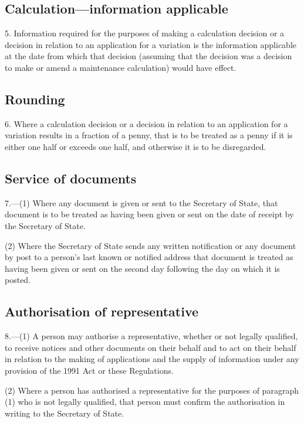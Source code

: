 \documentclass[12pt,a4paper]{article}
\begin{document}
\subsection[5. Calculation---information applicable]{Calculation---information applicable}

5.  Information required for the purposes of making a calculation decision or a decision in relation to an application for a variation is the information applicable at the date from which that decision (assuming that the decision was a decision to make or amend a maintenance calculation) would have effect.

\subsection[6. Rounding]{Rounding}

6.  Where a calculation decision or a decision in relation to an application for a variation results in a fraction of a penny, that is to be treated as a penny if it is either one half or exceeds one half, and otherwise it is to be disregarded.

\subsection[7. Service of documents]{Service of documents}

7.---(1)  Where any document is given or sent to the Secretary of State, that document is to be treated as having been given or sent on the date of receipt by the Secretary of State.

(2) Where the Secretary of State sends any written notification or any document by post to a person’s last known or notified address that document is treated as having been given or sent on the second day following the day on which it is posted.

\subsection[8. Authorisation of representative]{Authorisation of representative}

8.---(1)  A person may authorise a representative, whether or not legally qualified, to receive notices and other documents on their behalf and to act on their behalf in relation to the making of applications and the supply of information under any provision of the 1991 Act or these Regulations.

(2) Where a person has authorised a representative for the purposes of paragraph (1) who is not legally qualified, that person must confirm the authorisation in writing to the Secretary of State.
\end{document}
